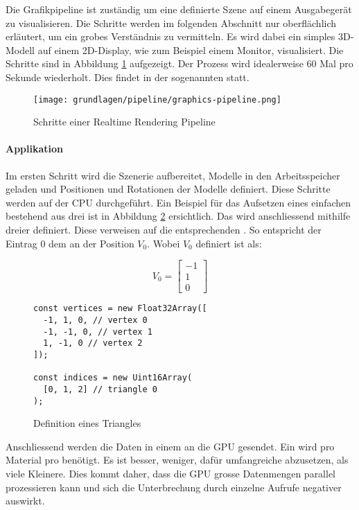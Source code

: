 Die Grafikpipeline ist zuständig um eine definierte Szene auf einem Ausgabegerät zu visualisieren. Die Schritte werden im folgenden Abschnitt nur oberflächlich erläutert, um ein grobes Verständnis zu vermitteln. Es wird dabei ein simples 3D-Modell auf einem 2D-Display, wie zum Beispiel einem Monitor, visualisiert. Die Schritte sind in Abbildung \ref{fig:renderingPipelineOverview} aufgezeigt. Der Prozess wird idealerweise 60 Mal pro Sekunde wiederholt. Dies findet in der sogenannten  statt.

\begin{figure}[H]
  \centering
  \texttt{[image: grundlagen/pipeline/graphics-pipeline.png]}
  \caption{Schritte einer Realtime Rendering Pipeline}
  \label{fig:renderingPipelineOverview}
\end{figure}

\paragraph{Applikation}
Im ersten Schritt wird die Szenerie aufbereitet, Modelle in den Arbeitsspeicher geladen und Positionen und Rotationen der Modelle definiert. Diese Schritte werden auf der CPU durchgeführt. Ein Beispiel für das Aufsetzen eines einfachen  bestehend aus drei  ist in Abbildung \ref{fig:geometryDefinition} ersichtlich. Das  wird anschliessend mithilfe dreier  definiert. Diese  verweisen auf die entsprechenden . So entspricht der Eintrag $0$ dem  an der Position $V_0$. Wobei $V_0$ definiert ist als:

$$
V_0 = \begin{bmatrix}
  -1 \\
  1 \\
  0
\end{bmatrix}
$$

\begin{figure}[H]
\begin{lstlisting}[style=JavaScript]
const vertices = new Float32Array([
  -1, 1, 0, // vertex 0
  -1, -1, 0, // vertex 1
  1, -1, 0 // vertex 2
]);

const indices = new Uint16Array(
  [0, 1, 2] // triangle 0
);
\end{lstlisting}
\caption{Definition eines Triangles}
\label{fig:geometryDefinition}
\end{figure}

Anschliessend werden die Daten in einem  an die GPU gesendet. Ein  wird pro Material pro  benötigt. Es ist besser, weniger, dafür umfangreiche  abzusetzen, als viele Kleinere. Dies kommt daher, dass die GPU grosse Datenmengen parallel prozessieren kann und sich die Unterbrechung durch einzelne Aufrufe negativer auswirkt.

